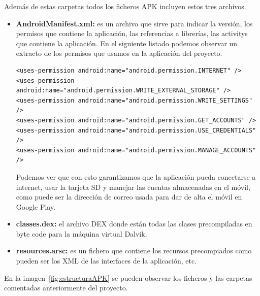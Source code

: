 Además de estas carpetas todos los ficheros APK incluyen estos tres archivos.

\begin{itemize}
\item \textbf{AndroidManifest.xml:} es un archivo que sirve para indicar la versión, los permisos que contiene la aplicación, las referencias a librerías, las activitys que contiene la aplicación. En el siguiente listado podemos observar un extracto de los permisos que usamos en la aplicación del proyecto.

\begin{lstlisting}[style=XML]
<uses-permission android:name="android.permission.INTERNET" />
<uses-permission android:name="android.permission.WRITE_EXTERNAL_STORAGE" />
<uses-permission android:name="android.permission.WRITE_SETTINGS" />
<uses-permission android:name="android.permission.GET_ACCOUNTS" />
<uses-permission android:name="android.permission.USE_CREDENTIALS" />
<uses-permission android:name="android.permission.MANAGE_ACCOUNTS" />
\end{lstlisting}

Podemos ver que con esto garantizamos que la aplicación pueda conectarse a internet, usar la tarjeta SD y manejar las cuentas almacenadas en el móvil, como puede ser la dirección de correo usada para dar de alta el móvil en Google Play.

\item \textbf{classes.dex:} el archivo DEX donde están todas las clases precompiladas en byte code para la máquina virtual Dalvik.

\item \textbf{resources.arsc:} es un fichero que contiene los recursos precompiados como pueden ser los XML de las interfaces de la aplicación, etc.

\end{itemize}

En la imagen~\ref{fig:estructuraAPK} se pueden observar los ficheros y las carpetas comentadas anteriormente del proyecto.

